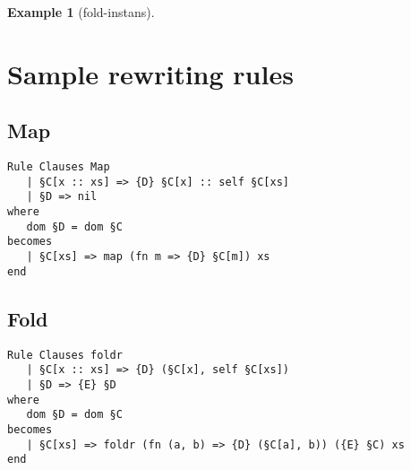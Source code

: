 \documentclass[oneside]{memoir}
\newcommand{\floor}[1]{\ensuremath{\lfloor #1 \rfloor}}
\theoremstyle{definition}
\newtheorem{example}{Example}
\begin{document}
\begin{example}[\textsf{fold}-instans]

      
    
    


  
\end{example}

\appendix

\chapter{Sample rewriting rules}

\section{Map}


\begin{verbatim}
Rule Clauses Map
   | §C[x :: xs] => {D} §C[x] :: self §C[xs]
   | §D => nil
where
   dom §D = dom §C
becomes
   | §C[xs] => map (fn m => {D} §C[m]) xs
end
\end{verbatim}


\section{Fold}

\begin{verbatim}
Rule Clauses foldr
   | §C[x :: xs] => {D} (§C[x], self §C[xs])
   | §D => {E} §D
where
   dom §D = dom §C
becomes
   | §C[xs] => foldr (fn (a, b) => {D} (§C[a], b)) ({E} §C) xs
end
\end{verbatim}
\end{document}
